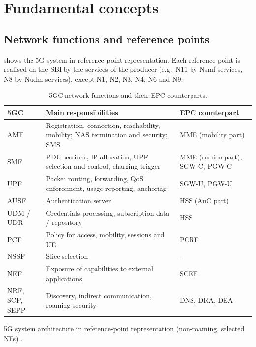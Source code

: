\documentclass[11pt,a4paper]{article}
\begin{document}
\section{Fundamental concepts}

\subsection{Network functions and reference points}
 shows the 5G system in reference-point representation. Each reference point is realised on the SBI by the
services of the producer (e.g.\ N11 by Nsmf services, N8 by Nudm services), except N1, N2, N3, N4, N6 and N9.
\begin{table}[htbp]
\centering\small
\caption{5GC network functions and their EPC counterparts.}\label{tab:map}
\begin{tabularx}{\linewidth}{@{}l Y l@{}}
\toprule
{}5GC & Main responsibilities & EPC counterpart \\
\midrule
AMF  & Registration, connection, reachability, mobility; NAS termination and security; SMS & MME (mobility part) \\
SMF  & PDU sessions, IP allocation, UPF selection and control, charging trigger & MME (session part), SGW-C, PGW-C \\
UPF  & Packet routing, forwarding, QoS enforcement, usage reporting, anchoring & SGW-U, PGW-U \\
AUSF & Authentication server                            & HSS (AuC part) \\
UDM / UDR & Credentials processing, subscription data / repository & HSS \\
PCF  & Policy for access, mobility, sessions and UE     & PCRF \\
NSSF & Slice selection                                  & -- \\
NEF  & Exposure of capabilities to external applications & SCEF \\
NRF, SCP, SEPP & Discovery, indirect communication, roaming security & DNS, DRA, DEA \\
\bottomrule
\end{tabularx}
\end{table}

\begin{acnfigure}
  \caption{5G system architecture in reference-point representation (non-roaming, selected NFs) \cite{ts23501}.}
  \label{fig:ref}
\end{acnfigure}
\end{document}
